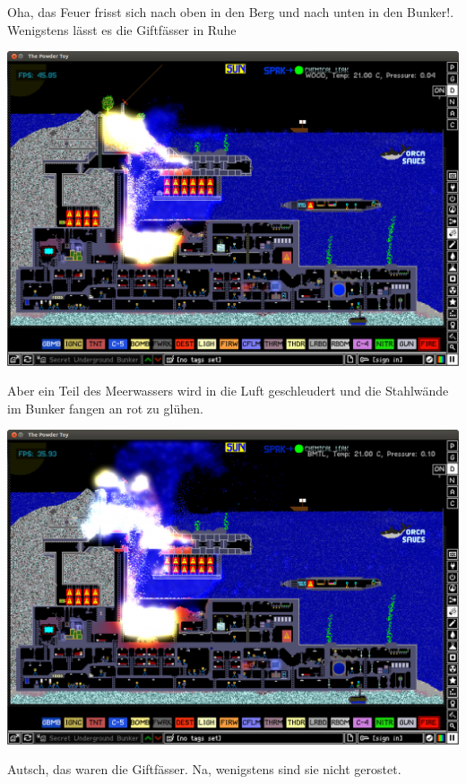 \begin{multicols}{2}
Oha, das Feuer frisst sich nach oben in den Berg und nach unten in den Bunker!. Wenigstens lässt es die Giftfässer in Ruhe
\begin{center}
\includegraphics[width=\linewidth]{powdertoy/powdertoy-bu5.png}
\end{center}
Aber ein Teil des Meerwassers wird in die Luft geschleudert und die Stahlwände im Bunker fangen an rot zu glühen.
\begin{center}
\includegraphics[width=\linewidth]{powdertoy/powdertoy-bu6.png}
\end{center}
Autsch, das waren die Giftfässer. Na, wenigstens sind sie nicht gerostet.
\begin{center}

\end{center}
\end{multicols}
